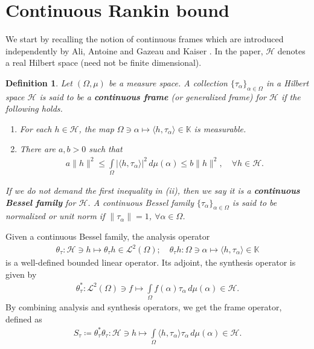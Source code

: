 \documentclass{amsart}
\newtheorem{definition}[theorem]{Definition}
\begin{document}
\section{Continuous Rankin bound}
We start by recalling the notion of  continuous frames which are introduced independently by Ali, Antoine and Gazeau \cite{ALIANTOINEGAZEAU} and Kaiser \cite{KAISER}. In the paper,    $\mathcal{H}$ denotes a real Hilbert space (need not be finite dimensional).
\begin{definition}\cite{ALIANTOINEGAZEAU, KAISER, ALIANTOINEGAZEAUBOOK, GABARDOHAN}
	Let 	$(\Omega, \mu)$ be a measure space. A collection   $\{\tau_\alpha\}_{\alpha\in \Omega}$ in 	a  Hilbert  space $\mathcal{H}$ is said to be a \textbf{continuous frame} (or generalized frame) for $\mathcal{H}$ if the following holds.
	\begin{enumerate}[\upshape(i)]
		\item For each $h \in \mathcal{H}$, the map $\Omega \ni \alpha \mapsto \langle h, \tau_\alpha \rangle \in \mathbb{K}$ is measurable.
		\item There are $a,b>0$ such that 
		\begin{align*}
			a\|h\|^2\leq \int\limits_{\Omega}|\langle h, \tau_\alpha \rangle|^2\,d\mu(\alpha)\leq b \|h\|^2, \quad \forall h \in \mathcal{H}.
		\end{align*}
	\end{enumerate}
 If we do not demand the first inequality in (ii), then we say it is a \textbf{continuous Bessel family} for $\mathcal{H}$. A continuous Bessel family $\{\tau_\alpha\}_{\alpha\in \Omega}$ is said to be normalized or unit norm if $\|\tau_\alpha\|=1$, $\forall \alpha \in \Omega$.
\end{definition}
 Given a continuous Bessel family, the analysis operator
\begin{align*}
	\theta_\tau:\mathcal{H} \ni h \mapsto \theta_\tau h \in \mathcal{L}^2(\Omega);  \quad \theta_\tau h:\Omega \ni \alpha \mapsto  \langle h, \tau_\alpha \rangle \in \mathbb{K}
\end{align*}
is a well-defined bounded linear operator. Its adjoint, the synthesis operator is given by 
\begin{align*}
	\theta_\tau^*:\mathcal{L}^2(\Omega)\ni f \mapsto \int\limits_{\Omega}f (\alpha)\tau_\alpha \,d\mu(\alpha)\in \mathcal{H}.
\end{align*}
By combining analysis and synthesis operators, we get the frame operator, defined as 
\begin{align*}
	S_\tau\coloneqq 	\theta_\tau^*	\theta_\tau:\mathcal{H} \ni h \mapsto\int\limits_{\Omega}\langle h, \tau_\alpha \rangle \tau_\alpha \,d\mu(\alpha)\in \mathcal{H}.
\end{align*}
\end{document}
